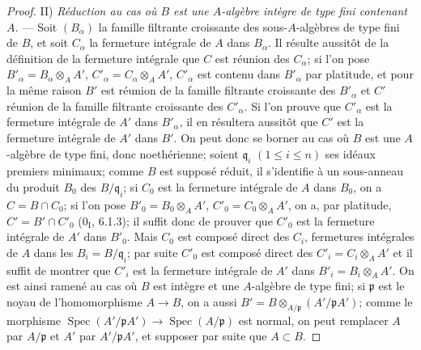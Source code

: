 \begin{proof}
II) \emph{Réduction au cas où $B$ est une $A$-algèbre intègre de type fini
contenant $A$.} --- Soit $(B_\alpha)$ la famille filtrante croissante des
sous-$A$-algèbres de type fini de $B$, et soit $C_\alpha$ la fermeture
intégrale de $A$ dans $B_\alpha$. Il résulte aussitôt de la définition de
la fermeture intégrale que $C$ est réunion des $C_\alpha$; si l'on pose
$B'_\alpha=B_\alpha\otimes_A A'$, $C'_\alpha=C_\alpha\otimes_A A'$,
$C'_\alpha$ est contenu dans $B'_\alpha$ par platitude, et pour la même
raison $B'$ est réunion de la famille filtrante croissante des
$B'_\alpha$ et $C'$ réunion de la famille filtrante croissante des
$C'_\alpha$. Si l'on prouve que $C'_\alpha$ est la fermeture intégrale de
$A'$ dans $B'_\alpha$, il en résultera aussitôt que $C'$ est la fermeture
intégrale de $A'$ dans $B'$. On peut donc se borner au cas où $B$ est une
$A$-algèbre de type fini, donc noethérienne; soient $\mathfrak q_i$
$(1\leqslant i\leqslant n)$ ses idéaux premiers minimaux; comme $B$ est
supposé réduit, il s'identifie à un sous-anneau du produit $B_0$ des
$B/\mathfrak q_i$; si $C_0$ est la fermeture intégrale de $A$ dans $B_0$,
on a $C=B\cap C_0$; si l'on pose $B'_0=B_0\otimes_A A'$,
$C'_0=C_0\otimes_A A'$, on a, par platitude,
$C'=B'\cap C'_0$ (0$_{\mathrm I}$, 6.1.3); il suffit donc de prouver que
$C'_0$ est la fermeture intégrale de $A'$ dans $B'_0$. Mais $C_0$ est
composé direct des $C_i$, fermetures intégrales de $A$ dans les
$B_i=B/\mathfrak q_i$; par suite $C'_0$ est composé direct des
$C'_i=C_i\otimes_A A'$ et il suffit de montrer que $C'_i$ est la fermeture
intégrale de $A'$ dans $B'_i=B_i\otimes_A A'$. On est ainsi ramené au cas
où $B$ est intègre et une $A$-algèbre de type fini; si $\mathfrak p$ est le
noyau de l'homomorphisme $A\to B$, on a aussi
$B'=B\otimes_{A/\mathfrak p}(A'/\mathfrak pA')$; comme le morphisme
$\operatorname{Spec}(A'/\mathfrak pA')\to
\operatorname{Spec}(A/\mathfrak p)$ est normal, on peut remplacer $A$ par
$A/\mathfrak p$ et $A'$ par $A'/\mathfrak pA'$, et supposer par suite que
$A\subset B$.


\end{proof}

